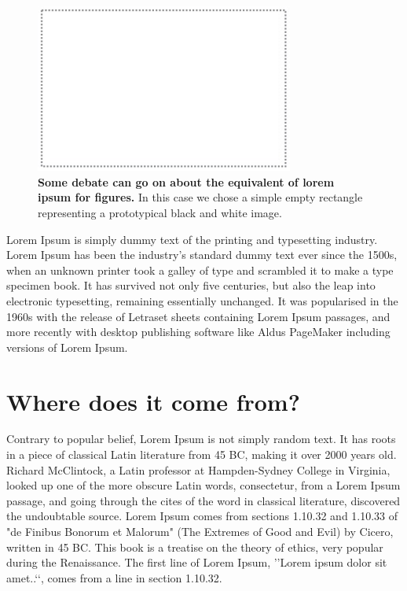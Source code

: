 \documentclass[]{article}
\begin{document}
\begin{figure}[ht]
\centering
\hspace{-0.5cm}
\includegraphics[width=8.5cm]{figures/lorem_ipsum_figure.pdf}
\caption{{\bf Some debate can go on about the equivalent of lorem ipsum for figures.} 
In this case we chose a simple 
empty rectangle 
representing a prototypical black and white image.}
\label{fig:f2}
\end{figure}

Lorem Ipsum is simply dummy text of the printing and typesetting industry. Lorem Ipsum has been the industry's standard dummy text ever since the 1500s, when an unknown printer took a galley of type and scrambled it to make a type specimen book. It has survived not only five centuries, but also the leap into electronic typesetting, remaining essentially unchanged. It was popularised in the 1960s with the release of Letraset sheets containing Lorem Ipsum passages, and more recently with desktop publishing software like Aldus PageMaker including versions of Lorem Ipsum.


\section{Where does it come from?}
Contrary to popular belief, Lorem Ipsum is not simply random text. It has roots in a piece of classical Latin literature from 45 BC, making it over 2000 years old. Richard McClintock, a 
Latin
professor at Hampden-Sydney College in 
Virginia, 
looked up one of the more obscure Latin words, consectetur, from a Lorem Ipsum passage, and going through the cites of the word in classical literature, discovered the undoubtable source. Lorem Ipsum comes from sections 1.10.32 and 1.10.33 of "de Finibus Bonorum et Malorum" 
(The Extremes of Good and Evil) 
by Cicero, written in 45 BC. This book is a treatise on the theory of ethics, very popular during the Renaissance. The first line of Lorem Ipsum, \rq\rq Lorem ipsum dolor sit amet..\lq\lq, comes from a line in section 1.10.32.
\end{document}
